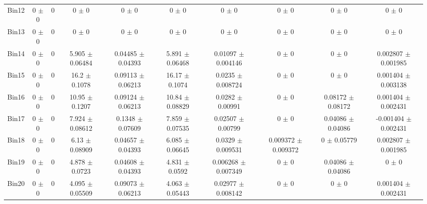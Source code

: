 \begin{tabular}{@{\extracolsep{4pt}}lccccccccc@{}}
     Bin12 & 0 $\pm$ 0 & 0 & 0 $\pm$ 0 & 0 $\pm$ 0 & 0 $\pm$ 0 & 0 $\pm$ 0 & 0 $\pm$ 0 & 0 $\pm$ 0 & 0 $\pm$ 0 \\ 
     Bin13 & 0 $\pm$ 0 & 0 & 0 $\pm$ 0 & 0 $\pm$ 0 & 0 $\pm$ 0 & 0 $\pm$ 0 & 0 $\pm$ 0 & 0 $\pm$ 0 & 0 $\pm$ 0 \\ 
     Bin14 & 0 $\pm$ 0 & 0 & 5.905 $\pm$ 0.06484 & 0.04485 $\pm$ 0.04393 & 5.891 $\pm$ 0.06468 & 0.01097 $\pm$ 0.004146 & 0 $\pm$ 0 & 0 $\pm$ 0 & 0.002807 $\pm$ 0.001985 \\ 
     Bin15 & 0 $\pm$ 0 & 0 & 16.2 $\pm$ 0.1078 & 0.09113 $\pm$ 0.06213 & 16.17 $\pm$ 0.1074 & 0.0235 $\pm$ 0.008724 & 0 $\pm$ 0 & 0 $\pm$ 0 & 0.001404 $\pm$ 0.003138 \\ 
     Bin16 & 0 $\pm$ 0 & 0 & 10.95 $\pm$ 0.1207 & 0.09124 $\pm$ 0.06213 & 10.84 $\pm$ 0.08829 & 0.0282 $\pm$ 0.00991 & 0 $\pm$ 0 & 0.08172 $\pm$ 0.08172 & 0.001404 $\pm$ 0.002431 \\ 
     Bin17 & 0 $\pm$ 0 & 0 & 7.924 $\pm$ 0.08612 & 0.1348 $\pm$ 0.07609 & 7.859 $\pm$ 0.07535 & 0.02507 $\pm$ 0.00799 & 0 $\pm$ 0 & 0.04086 $\pm$ 0.04086 & -0.001404 $\pm$ 0.002431 \\ 
     Bin18 & 0 $\pm$ 0 & 0 & 6.13 $\pm$ 0.08909 & 0.04657 $\pm$ 0.04393 & 6.085 $\pm$ 0.06645 & 0.0329 $\pm$ 0.009531 & 0.009372 $\pm$ 0.009372 & 0 $\pm$ 0.05779 & 0.002807 $\pm$ 0.001985 \\ 
     Bin19 & 0 $\pm$ 0 & 0 & 4.878 $\pm$ 0.0723 & 0.04608 $\pm$ 0.04393 & 4.831 $\pm$ 0.0592 & 0.006268 $\pm$ 0.007349 & 0 $\pm$ 0 & 0.04086 $\pm$ 0.04086 & 0 $\pm$ 0 \\ 
     Bin20 & 0 $\pm$ 0 & 0 & 4.095 $\pm$ 0.05509 & 0.09073 $\pm$ 0.06213 & 4.063 $\pm$ 0.05443 & 0.02977 $\pm$ 0.008142 & 0 $\pm$ 0 & 0 $\pm$ 0 & 0.001404 $\pm$ 0.002431 \\ 
\hline\hline
  \end{tabular}

